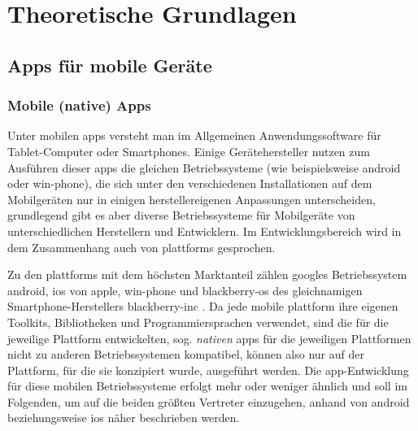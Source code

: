 \part{Theoretische Grundlagen}	\label{sec:grundlagen}

\chapter{Apps für mobile Geräte}

\section{Mobile (native) Apps} \label{sec:native}
Unter mobilen \glspl{app} versteht man im Allgemeinen Anwendungssoftware für Tablet-Computer oder Smartphones. 
Einige Gerätehersteller nutzen zum Ausführen dieser \glspl{app} die gleichen Betriebssysteme (wie beispielsweise \gls{android} oder \gls{win-phone}), die sich unter den verschiedenen Installationen auf dem Mobilgeräten nur in einigen herstellereigenen Anpassungen unterscheiden, grundlegend gibt es aber diverse Betriebssysteme für Mobilgeräte von unterschiedlichen Herstellern und Entwicklern.
Im Entwicklungsbereich wird in dem Zusammenhang auch von \glspl{plattform} gesprochen.

Zu den \glspl{plattform} mit dem höchsten Marktanteil zählen \glspl{google} Betriebssystem \gls{android}, \gls{ios} von \gls{apple}, \gls{win-phone} und \gls{blackberry-os} des gleichnamigen Smartphone-Herstellers \gls{blackberry-inc} \cite{platforms-marketshare}.
Da jede mobile \gls{plattform} ihre eigenen Toolkits, Bibliotheken und Programmiersprachen verwendet, sind die für die jeweilige Plattform entwickelten, sog. \emph{nativen} \glspl{app} für die jeweiligen Plattformen nicht zu anderen Betriebssystemen kompatibel, können also nur auf der Plattform, für die sie konzipiert wurde, ausgeführt werden.
Die \gls{app}-Entwicklung für diese mobilen Betriebssysteme erfolgt mehr oder weniger ähnlich und soll im Folgenden, um auf die beiden größten Vertreter einzugehen, anhand von \gls{android} beziehungsweise \gls{ios} näher beschrieben werden.

